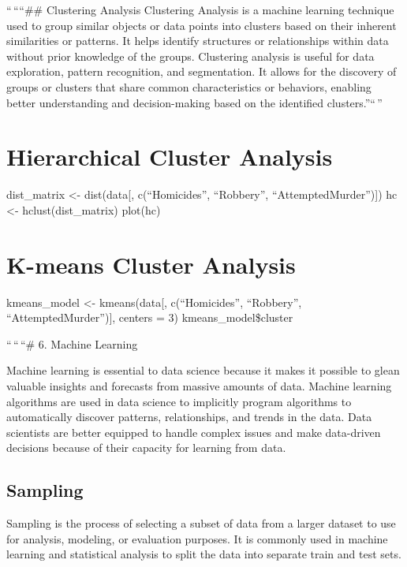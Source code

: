 \documentclass[
]{article}
\begin{document}
``\,````\#\# Clustering Analysis Clustering Analysis is a machine
learning technique used to group similar objects or data points into
clusters based on their inherent similarities or patterns. It helps
identify structures or relationships within data without prior knowledge
of the groups. Clustering analysis is useful for data exploration,
pattern recognition, and segmentation. It allows for the discovery of
groups or clusters that share common characteristics or behaviors,
enabling better understanding and decision-making based on the
identified clusters.''``\,''

\hypertarget{hierarchical-cluster-analysis}{%
\section{Hierarchical Cluster
Analysis}\label{hierarchical-cluster-analysis}}

dist\_matrix \textless- dist(data{[}, c(``Homicides'', ``Robbery'',
``AttemptedMurder''){]}) hc \textless- hclust(dist\_matrix) plot(hc)

\hypertarget{k-means-cluster-analysis}{%
\section{K-means Cluster Analysis}\label{k-means-cluster-analysis}}

kmeans\_model \textless- kmeans(data{[}, c(``Homicides'', ``Robbery'',
``AttemptedMurder''){]}, centers = 3) kmeans\_model\$cluster

``\,``\,``\# 6. Machine Learning

Machine learning is essential to data science because it makes it
possible to glean valuable insights and forecasts from massive amounts
of data. Machine learning algorithms are used in data science to
implicitly program algorithms to automatically discover patterns,
relationships, and trends in the data. Data scientists are better
equipped to handle complex issues and make data-driven decisions because
of their capacity for learning from data.

\hypertarget{sampling}{%
\subsection{Sampling}\label{sampling}}

Sampling is the process of selecting a subset of data from a larger
dataset to use for analysis, modeling, or evaluation purposes. It is
commonly used in machine learning and statistical analysis to split the
data into separate train and test sets.
\end{document}
